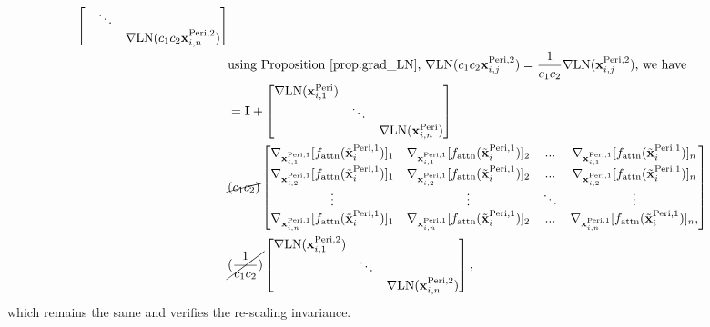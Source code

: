 \documentclass[journal]{IEEEtran}
\newcommand{\bfI}{{\bf I}}
\newcommand{\bfx}{{\bf x}}
\theoremstyle{plain}
\theoremstyle{definition}
\theoremstyle{remark}
\begin{document}
\begin{align}
\begin{bmatrix}
                 & \ddots &        \\
                 &        & \nabla {\rm LN}( c_1 c_2\bfx^{{\rm Peri}, 2}_{i, n})
\end{bmatrix} \\
& \text{using Proposition~\ref{prop:grad_LN}, $\nabla {\rm LN}(c_1 c_2 \bfx^{{\rm Peri}, 2}_{i, j})=\frac{1}{c_1 c_2} \nabla {\rm LN}(\bfx^{{\rm Peri}, 2}_{i, j})$, we have} \\
&= \bfI + \begin{bmatrix}
\nabla {\rm LN}(\bfx^{{\rm Peri}}_{i, 1}) &        &        \\
                 & \ddots &        \\
                 &        & \nabla {\rm LN}(\bfx^{{\rm Peri}}_{i, n})
\end{bmatrix} \\ 
& \cancel{(c_1 c_2)} \begin{bmatrix}
 \nabla_{\bfx^{{\rm Peri},1}_{i, 1}} [f_{\rm attn}(\tilde{\bfx}^{{\rm Peri},1}_{i})]_1 &  \nabla_{\bfx^{{\rm Peri},1}_{i, 1}} [f_{\rm attn}(\tilde{\bfx}^{{\rm Peri},1}_{i})]_2  & ...    &   \nabla_{\bfx^{{\rm Peri},1}_{i, 1}} [f_{\rm attn}(\tilde{\bfx}^{{\rm Peri},1}_{i})]_n    \\
 \nabla_{\bfx^{{\rm Peri},1}_{i, 2}} [f_{\rm attn}(\tilde{\bfx}^{{\rm Peri},1}_{i})]_1 &  \nabla_{\bfx^{{\rm Peri},1}_{i, 2}} [f_{\rm attn}(\tilde{\bfx}^{{\rm Peri},1}_{i})]_2  & ...    &    \nabla_{\bfx^{{\rm Peri},1}_{i, 2}} [f_{\rm attn}(\tilde{\bfx}^{{\rm Peri},1}_{i})]_n    \\
     \vdots        &  \vdots  & \ddots &    \vdots    \\
\nabla_{\bfx^{{\rm Peri},1}_{i, n}} [f_{\rm attn}(\tilde{\bfx}^{{\rm Peri},1}_{i})]_1 &  \nabla_{\bfx^{{\rm Peri},1}_{i, n}} [f_{\rm attn}(\tilde{\bfx}^{{\rm Peri},1}_{i})]_2  & ...    &   \nabla_{\bfx^{{\rm Peri},1}_{i, n}} [f_{\rm attn}(\tilde{\bfx}^{{\rm Peri},1}_{i})]_n,   
\end{bmatrix}\\ 
& \cancel{(\frac{1}{c_1 c_2})} \begin{bmatrix}
\nabla {\rm LN}(\bfx^{{\rm Peri}, 2}_{i, 1}) &        &        \\
                 & \ddots &        \\
                 &        & \nabla {\rm LN}(\bfx^{{\rm Peri}, 2}_{i, n})
\end{bmatrix},
\end{align}
which remains the same and verifies the re-scaling invariance.
\end{document}
